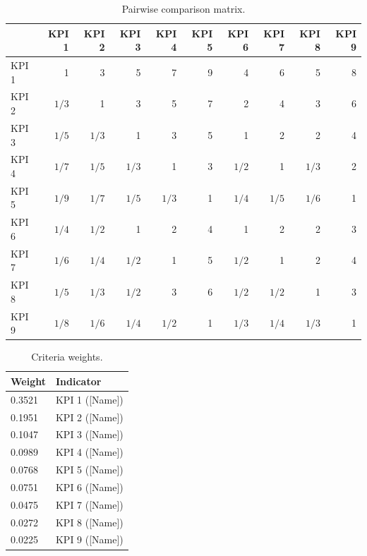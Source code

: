 \documentclass[10pt,twocolumn]{article}
\newcommand{\tabfont}{\fontsize{8.5}{10.5}\selectfont}
\begin{document}
\begin{table}[ht]
\caption{Pairwise comparison matrix.}
\label{tab:pairwise}
\tabfont
\setlength{\tabcolsep}{5pt}
\renewcommand{\arraystretch}{1.15}
\begin{tabular}{lrrrrrrrrr}
\toprule
 & \textbf{KPI 1} & \textbf{KPI 2} & \textbf{KPI 3}
 & \textbf{KPI 4} & \textbf{KPI 5} & \textbf{KPI 6}
 & \textbf{KPI 7} & \textbf{KPI 8} & \textbf{KPI 9} \\
\midrule
KPI 1 & 1       & 3       & 5       & 7       & 9       & 4       & 6       & 5       & 8       \\
KPI 2 & $1/3$   & 1       & 3       & 5       & 7       & 2       & 4       & 3       & 6       \\
KPI 3 & $1/5$   & $1/3$   & 1       & 3       & 5       & 1       & 2       & 2       & 4       \\
KPI 4 & $1/7$   & $1/5$   & $1/3$   & 1       & 3       & $1/2$   & 1       & $1/3$   & 2       \\
KPI 5 & $1/9$   & $1/7$   & $1/5$   & $1/3$   & 1       & $1/4$   & $1/5$   & $1/6$   & 1       \\
KPI 6 & $1/4$   & $1/2$   & 1       & 2       & 4       & 1       & 2       & 2       & 3       \\
KPI 7 & $1/6$   & $1/4$   & $1/2$   & 1       & 5       & $1/2$   & 1       & 2       & 4       \\
KPI 8 & $1/5$   & $1/3$   & $1/2$   & 3       & 6       & $1/2$   & $1/2$   & 1       & 3       \\
KPI 9 & $1/8$   & $1/6$   & $1/4$   & $1/2$   & 1       & $1/3$   & $1/4$   & $1/3$   & 1       \\
\bottomrule
\end{tabular}
\end{table}

\begin{table}[H]
\caption{Criteria weights.}
\label{tab:ahpweights}
\tabfont
\setlength{\tabcolsep}{6pt}
\begin{tabularx}{\columnwidth}{lX}
\toprule
\textbf{Weight} & \textbf{Indicator} \\
\midrule
0.3521 & KPI 1 ([Name]) \\
0.1951 & KPI 2 ([Name]) \\
0.1047 & KPI 3 ([Name]) \\
0.0989 & KPI 4 ([Name]) \\
0.0768 & KPI 5 ([Name]) \\
0.0751 & KPI 6 ([Name]) \\
0.0475 & KPI 7 ([Name]) \\
0.0272 & KPI 8 ([Name]) \\
0.0225 & KPI 9 ([Name]) \\
\bottomrule
\end{tabularx}
\end{table}
\end{document}
